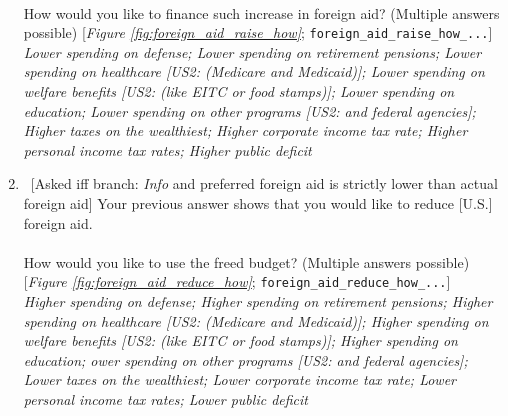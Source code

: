 \begin{enumerate}[resume]
\\
  How would you like to finance such increase in foreign aid? (Multiple answers possible) [\textit{Figure \ref{fig:foreign_aid_raise_how}}; \verb|foreign_aid_raise_how_...|]
  \\ \textit{Lower spending on defense; Lower spending on retirement pensions; Lower spending on healthcare [US2: (Medicare and Medicaid)]; Lower spending on welfare benefits [US2: (like EITC or food stamps)]; Lower spending on education; Lower spending on other programs [US2: and federal agencies]; Higher taxes on the wealthiest; Higher corporate income tax rate; Higher personal income tax rates; Higher public deficit}
  \item  \label{q:foreign_aid_reduce_how} ~[Asked iff branch: \textit{Info} and preferred foreign aid is strictly lower than actual foreign aid] Your previous answer shows that you would like to reduce [U.S.] foreign aid.\\
\\
  How would you like to use the freed budget? (Multiple answers possible) [\textit{Figure \ref{fig:foreign_aid_reduce_how}}; \verb|foreign_aid_reduce_how_...|]
  \\ \textit{Higher spending on defense; Higher spending on retirement pensions; Higher spending on healthcare [US2: (Medicare and Medicaid)]; Higher spending on welfare benefits [US2: (like EITC or food stamps)]; Higher spending on education; ower spending on other programs [US2: and federal agencies]; Lower taxes on the wealthiest; Lower corporate income tax rate; Lower personal income tax rates; Lower public deficit}
\end{enumerate}

